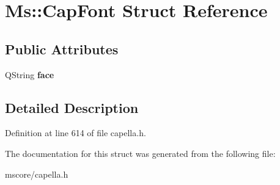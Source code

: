 \hypertarget{struct_ms_1_1_cap_font}{}\section{Ms\+:\+:Cap\+Font Struct Reference}
\label{struct_ms_1_1_cap_font}
\subsection*{Public Attributes}
\begin{DoxyCompactItemize}
\item 
\mbox{\label{struct_ms_1_1_cap_font_a750729eaa0c8ab0324ee2874cf3b047b}} 
Q\+String {\bfseries face}
\end{DoxyCompactItemize}


\subsection{Detailed Description}


Definition at line 614 of file capella.\+h.



The documentation for this struct was generated from the following file\+:\begin{DoxyCompactItemize}
\item 
mscore/capella.\+h\end{DoxyCompactItemize}
